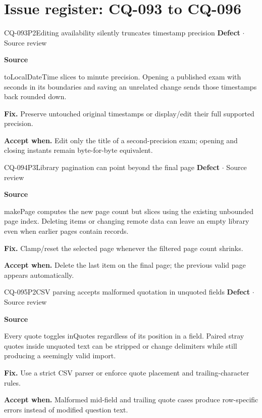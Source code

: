 \section*{Issue register: CQ-093 to CQ-096}
\begin{finding}{CQ-093}{P2}{Editing availability silently truncates timestamp precision}
\textbf{Defect} $\cdot$ Source review\par
\textbf{Source}\quad{}\par
toLocalDateTime slices to minute precision. Opening a published exam with seconds in its boundaries and saving an unrelated change sends those timestamps back rounded down.\par
\textbf{Fix.} Preserve untouched original timestamps or display/edit their full supported precision.\par
\textbf{Accept when.} Edit only the title of a second-precision exam; opening and closing instants remain byte-for-byte equivalent.
\end{finding}
\begin{finding}{CQ-094}{P3}{Library pagination can point beyond the final page}
\textbf{Defect} $\cdot$ Source review\par
\textbf{Source}\quad{}\par
makePage computes the new page count but slices using the existing unbounded page index. Deleting items or changing remote data can leave an empty library even when earlier pages contain records.\par
\textbf{Fix.} Clamp/reset the selected page whenever the filtered page count shrinks.\par
\textbf{Accept when.} Delete the last item on the final page; the previous valid page appears automatically.
\end{finding}
\begin{finding}{CQ-095}{P2}{CSV parsing accepts malformed quotation in unquoted fields}
\textbf{Defect} $\cdot$ Source review\par
\textbf{Source}\quad{}\par
Every quote toggles inQuotes regardless of its position in a field. Paired stray quotes inside unquoted text can be stripped or change delimiters while still producing a seemingly valid import.\par
\textbf{Fix.} Use a strict CSV parser or enforce quote placement and trailing-character rules.\par
\textbf{Accept when.} Malformed mid-field and trailing quote cases produce row-specific errors instead of modified question text.
\end{finding}
